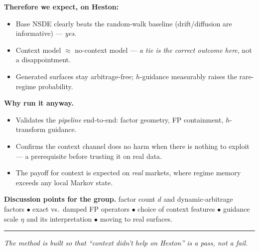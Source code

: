 \documentclass[12pt]{article}
\newcommand{\footer}[1]{\vfill\noindent\rule{\linewidth}{0.3pt}\par
  {\small\itshape #1}}
\begin{document}
\vspace{8pt}
\textbf{Therefore we expect, on Heston:}
\begin{itemize}
\item Base NSDE clearly beats the random-walk baseline (drift/diffusion are
  informative) --- \emph{yes}.
\item Context model $\approx$ no-context model --- \emph{a tie is the
  correct outcome here}, not a disappointment.
\item Generated surfaces stay arbitrage-free; $h$-guidance measurably
  raises the rare-regime probability.
\end{itemize}

\vspace{8pt}
\textbf{Why run it anyway.}
\begin{itemize}
\item Validates the \emph{pipeline} end-to-end: factor geometry, FP
  containment, $h$-transform guidance.
\item Confirms the context channel does no harm when there is nothing to
  exploit --- a prerequisite before trusting it on real data.
\item The payoff for context is expected on \emph{real} markets, where
  regime memory exceeds any local Markov state.
\end{itemize}

\vspace{6pt}
\textbf{Discussion points for the group.}
factor count $d$ and dynamic-arbitrage factors $\bullet$ exact vs.\ damped
FP operators $\bullet$ choice of context features $\bullet$ guidance scale
$\eta$ and its interpretation $\bullet$ moving to real surfaces.

\footer{The method is built so that ``context didn't help on Heston'' is a pass, not a fail.}
\clearpage
\end{document}
